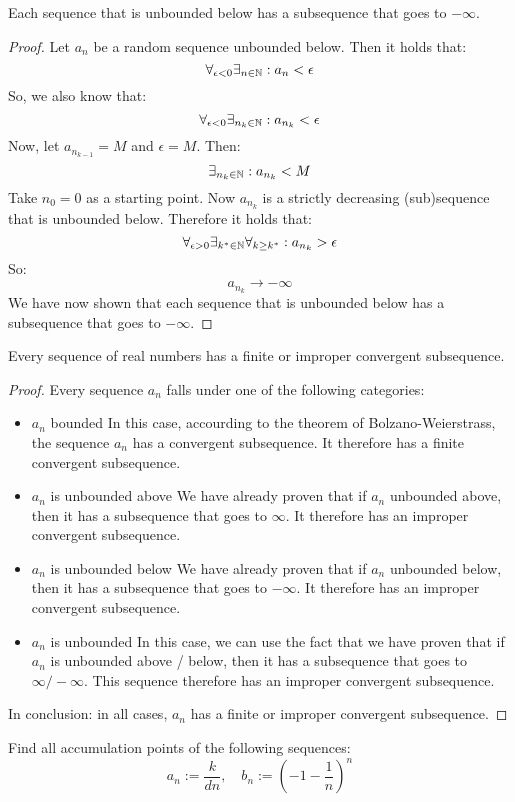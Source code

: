 \documentclass[week=4]{homework}
\begin{document}
\begin{questions}
        \begin{inlinetoprove}
        	Each sequence that is unbounded below has a subsequence that goes to $- \infty$.
        \end{inlinetoprove}
        \begin{proof}
        	Let $a_n$ be a random sequence unbounded below. Then it holds that:
        	\[
        	\forall_{\epsilon < 0} \exists_{n \in \naturals} : a_n < \epsilon
        	\]
        	So, we also know that:
        	\[
        	\forall_{\epsilon < 0} \exists_{n_k \in \naturals} : a_{n_{k}} < \epsilon
        	\]
        	Now, let $a_{n_{k-1}} = M$ and $\epsilon = M$. Then: 
        	\[
        	\exists_{n_k \in \mathbb{N}} : a_{n_{k}} < M
        	\]
        	Take $n_0 = 0$ as a starting point. Now $a_{n_k}$ is a strictly decreasing (sub)sequence that is unbounded below. Therefore it holds that:
        	\[
        	\forall_{\epsilon > 0} \exists_{k^* \in \naturals} \forall_{k \ge k^*} : a_{n_k} > \epsilon
        	\]
        	So:
        	\[
        	a_{n_k} \to -\infty 
        	\]
        	We have now shown that each sequence that is unbounded below has a subsequence that goes to $- \infty$.
        \end{proof}
        
        \begin{inlinetoprove}
        	Every sequence of real numbers has a finite or improper convergent subsequence. 
        \end{inlinetoprove}
        \begin{proof}
        	Every sequence $a_n$ falls under one of the following categories:
        	\begin{itemize}
        		\item $a_n$ bounded
        	In this case, accourding to the theorem of Bolzano-Weierstrass, the sequence $a_n$ has a convergent subsequence. It therefore has a finite convergent subsequence.  
        		\item $a_n$ is unbounded above
        	We have already proven that if $a_n$ unbounded above, then it has a subsequence that goes to $\infty$. It therefore has an improper convergent subsequence. 
        		\item $a_n$ is unbounded below
        	We have already proven that if $a_n$ unbounded below, then it has a subsequence that goes to $- \infty$. It therefore has an improper convergent subsequence. 
        		\item $a_n$ is unbounded
	        In this case, we can use the fact that we have proven that if $a_n$ is unbounded above / below, then it has a subsequence that goes to $\infty / - \infty$. This sequence therefore has an improper convergent subsequence. 
        	\end{itemize}
        	In conclusion: in all cases, $a_n$ has a finite or improper convergent subsequence. 
        \end{proof}
        \question
        Find all accumulation points of the following sequences:
        \[
	        a_n := \frac{k}{dn}, \quad b_n := \left(-1-\frac{1}{n}\right)^n
        \]
        

\end{questions}
\end{document}
